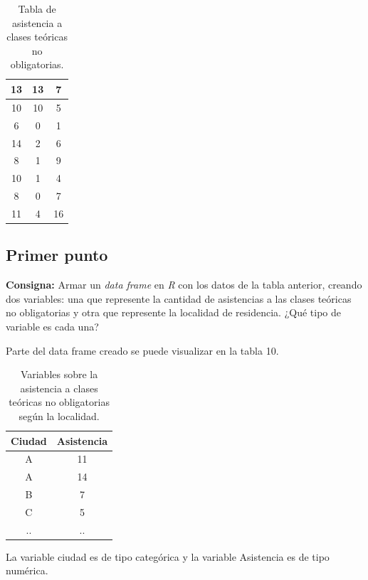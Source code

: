 \documentclass{article} %
\begin{document}
\begin{table}[H]
\begin{tabular}{|| c | c | c ||}
            \hline
            13 & 13 & 7\\
            \hline
            10 & 10 & 5\\
            \hline
            6 & 0 & 1\\
            \hline
            14 & 2 & 6\\
            \hline
            8 & 1 & 9\\
            \hline
            10 & 1 & 4\\
            \hline
            8 & 0 & 7\\
            \hline
            11 & 4 & 16\\
            \hline
			\hline
		\end{tabular}
		\caption{Tabla de asistencia a clases teóricas no obligatorias.}
	\label{tab:tabla-punto-4}
\end{table}

\subsection{Primer punto}

\textbf{Consigna:} Armar un \textit{data frame} en \textit{R} con los datos de la tabla anterior, creando dos variables: una que represente la cantidad de asistencias a las clases teóricas no obligatorias y otra que represente la localidad de residencia. ¿Qué tipo de variable es cada una?

Parte del data frame creado se puede visualizar en la tabla 10.

\begin{table}[H]
	\centering
		\begin{tabular}{|| c | c ||}
			\hline
			\hline
			Ciudad & Asistencia\\
			\hline
			\hline		
			A & 11\\
			\hline
			A & 14\\
			\hline
			B & 7\\
            \hline
            C & 5\\
            \hline
            .. & ..\\
            \hline
			\hline
		\end{tabular}
		\caption{Variables sobre la asistencia a clases teóricas no obligatorias según la localidad.}
	\label{tab:tabla-punto-4-1}
\end{table}

La variable ciudad es de tipo categórica y la variable Asistencia es de tipo numérica.
\end{document}
